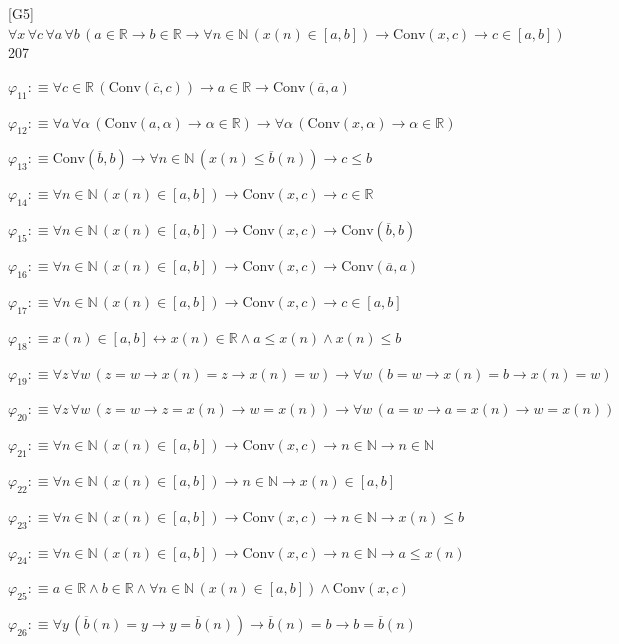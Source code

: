 \begin{fullproof}{[G5]}{$\forall x\,\forall c\,\forall a\,\forall b\,(a \in \mathbb{R} \to b \in \mathbb{R} \to \forall n \in \mathbb{N}\,(x(n) \in [a,b]) \to \mathrm{Conv}(x,c) \to c \in [a,b])$}{207}
\begin{abbrevlist}
\item $\varphi_{11} :\equiv \forall c \in \mathbb{R}\,(\mathrm{Conv}(\overline{c},c)) \to a \in \mathbb{R} \to \mathrm{Conv}(\overline{a},a)$
\item $\varphi_{12} :\equiv \forall a\,\forall \alpha\,(\mathrm{Conv}(a,\alpha) \to \alpha \in \mathbb{R}) \to \forall \alpha\,(\mathrm{Conv}(x,\alpha) \to \alpha \in \mathbb{R})$
\item $\varphi_{13} :\equiv \mathrm{Conv}(\overline{b},b) \to \forall n \in \mathbb{N}\,(x(n) \leq \overline{b}(n)) \to c \leq b$
\item $\varphi_{14} :\equiv \forall n \in \mathbb{N}\,(x(n) \in [a,b]) \to \mathrm{Conv}(x,c) \to c \in \mathbb{R}$
\item $\varphi_{15} :\equiv \forall n \in \mathbb{N}\,(x(n) \in [a,b]) \to \mathrm{Conv}(x,c) \to \mathrm{Conv}(\overline{b},b)$
\item $\varphi_{16} :\equiv \forall n \in \mathbb{N}\,(x(n) \in [a,b]) \to \mathrm{Conv}(x,c) \to \mathrm{Conv}(\overline{a},a)$
\item $\varphi_{17} :\equiv \forall n \in \mathbb{N}\,(x(n) \in [a,b]) \to \mathrm{Conv}(x,c) \to c \in [a,b]$
\item $\varphi_{18} :\equiv x(n) \in [a,b] \leftrightarrow x(n) \in \mathbb{R} \land a \leq x(n) \land x(n) \leq b$
\item $\varphi_{19} :\equiv \forall z\,\forall w\,(z = w \to x(n) = z \to x(n) = w) \to \forall w\,(b = w \to x(n) = b \to x(n) = w)$
\item $\varphi_{20} :\equiv \forall z\,\forall w\,(z = w \to z = x(n) \to w = x(n)) \to \forall w\,(a = w \to a = x(n) \to w = x(n))$
\item $\varphi_{21} :\equiv \forall n \in \mathbb{N}\,(x(n) \in [a,b]) \to \mathrm{Conv}(x,c) \to n \in \mathbb{N} \to n \in \mathbb{N}$
\item $\varphi_{22} :\equiv \forall n \in \mathbb{N}\,(x(n) \in [a,b]) \to n \in \mathbb{N} \to x(n) \in [a,b]$
\item $\varphi_{23} :\equiv \forall n \in \mathbb{N}\,(x(n) \in [a,b]) \to \mathrm{Conv}(x,c) \to n \in \mathbb{N} \to x(n) \leq b$
\item $\varphi_{24} :\equiv \forall n \in \mathbb{N}\,(x(n) \in [a,b]) \to \mathrm{Conv}(x,c) \to n \in \mathbb{N} \to a \leq x(n)$
\item $\varphi_{25} :\equiv a \in \mathbb{R} \land b \in \mathbb{R} \land \forall n \in \mathbb{N}\,(x(n) \in [a,b]) \land \mathrm{Conv}(x,c)$
\item $\varphi_{26} :\equiv \forall y\,(\overline{b}(n) = y \to y = \overline{b}(n)) \to \overline{b}(n) = b \to b = \overline{b}(n)$

\end{abbrevlist}
\end{fullproof}
